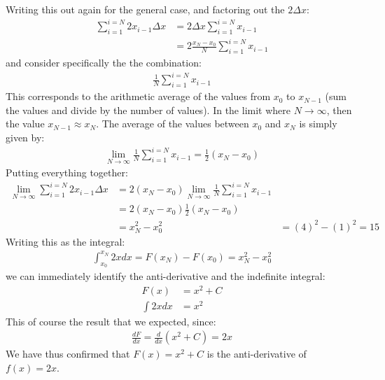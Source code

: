Writing this out again for the general case, and factoring out the $2\Delta x$:
\begin{align*}
\sum_{i=1}^{i=N} 2x_{i-1} \Delta x &=2 \Delta x\sum_{i=1}^{i=N}x_{i-1}\\
&=2 \frac{x_N-x_0}{N}\sum_{i=1}^{i=N}x_{i-1}
\end{align*}
and consider specifically the the combination:
\begin{align*}
\frac{1}{N}\sum_{i=1}^{i=N}x_{i-1}
\end{align*}
This corresponds to the arithmetic average of the values from $x_0$ to $x_{N-1}$ (sum the values and divide by the number of values). In the limit where $N\to \infty$, then the value $x_{N-1}\approx x_N$. The average of the values between $x_0$ and $x_N$ is simply given by:
\begin{align*}
\lim_{N\to\infty}\frac{1}{N}\sum_{i=1}^{i=N}x_{i-1}=\frac{1}{2}(x_N-x_0)
\end{align*}
Putting everything together:
\begin{align*}
\lim_{N\to\infty}\sum_{i=1}^{i=N} 2x_{i-1} \Delta x &=2 (x_N-x_0)\lim_{N\to\infty}\frac{1}{N}\sum_{i=1}^{i=N}x_{i-1}\\
&=2 (x_N-x_0)\frac{1}{2}(x_N-x_0)\\
&=x_N^2 - x_0^2
&=(4)^2 - (1)^2 = 15
\end{align*}
Writing this as the integral:
\begin{align*}
\int_{x_0}^{x_N}2x dx=F(x_N) - F(x_0)=x_N^2 - x_0^2
\end{align*}
we can immediately identify the anti-derivative and the indefinite integral:
\begin{align*}
F(x) &= x^2 +C \\
\int 2xdx&=x^2
\end{align*}
This of course the result that we expected, since:
\begin{align*}
\frac{dF}{dx}=\frac{d}{dx}(x^2+C) = 2x
\end{align*}
We have thus confirmed that $F(x)=x^2+C$ is the anti-derivative of $f(x)=2x$.


